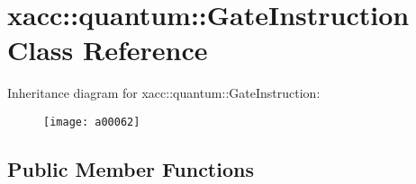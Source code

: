 \hypertarget{a00062}{}\section{xacc\+:\+:quantum\+:\+:Gate\+Instruction Class Reference}
\label{a00062}
Inheritance diagram for xacc\+:\+:quantum\+:\+:Gate\+Instruction\+:\begin{figure}[H]
\begin{center}
\leavevmode
\texttt{[image: a00062]}
\end{center}
\end{figure}
\subsection*{Public Member Functions}
